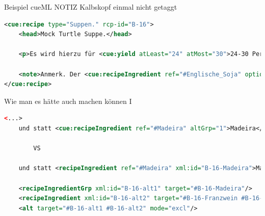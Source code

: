 \documentclass[12pt]{beamer}
\begin{document}
\begin{frame}[fragile]{Beispiel cueML}
NOTIZ Kalbskopf einmal nicht getaggt
	\begin{lstlisting}[language=XML]
<cue:recipe type="Suppen." rcp-id="B-16">
	<head>Mock Turtle Suppe.</head>
	
	<p>Es wird hierzu für <cue:yield atLeast="24" atMost="30">24-30 Personen</cue:yield> eine kräftige <ref target="#Bouillon">Bouillon</ref> von 8-10 Pfund <cue:recipeIngredient ref="#Rindkochfleisch" atLeast="8" atMost="10" unit="Pfund">Rindfleisch</cue:recipeIngredient> mit <cue:recipeIngredient ref="#Wurzelwerk">Wurzelwerk </cue:recipeIngredient> gekocht. [...]</p>
	
	<note>Anmerk. Der <cue:recipeIngredient ref="#Englische_Soja" optional="True">Soja</cue:recipeIngredient> macht die Suppe gewürzreicher, kann jedoch gut wegbleiben, und statt <cue:recipeIngredient ref="#Madeira" altGrp="1">Madeira</cue:recipeIngredient> kann man <cue:recipeIngredient ref="weißen_Franzwein" altGrp="2">weißen Franzwein</cue:recipeIngredient> und etwas <cue:recipeIngredient ref="#Rum" altGrp="2" quantity="etwas">Rum</cue:recipeIngredient> nehmen<cue:alt target="1 2"/>. Sowohl die Bouillon als Kalbskopf können schon am vorhergehenden Tage, ohne Nachtheil der Suppe, gekocht werden.</note>
</cue:recipe>
	\end{lstlisting}
\end{frame}

\begin{frame}[fragile]{Wie man es hätte auch machen können I}
	\begin{lstlisting}[language=XML]
	<...>
	und statt <cue:recipeIngredient ref="#Madeira" altGrp="1">Madeira</cue:recipeIngredient> kann man <cue:recipeIngredient ref="weißen_Franzwein" altGrp="2">weißen Franzwein</cue:recipeIngredient> und etwas <cue:recipeIngredient ref="#Rum" altGrp="2" quantity="etwas">Rum</cue:recipeIngredient> nehmen <cue:alt target="1 2"/>.
	
		VS
	
	und statt <recipeIngredient ref="#Madeira" xml:id="B-16-Madeira">Madeira</recipeIngredient> kann man <recipeIngredient ref="weißen_Franzwein" xml:id="B-16-Franzwein">weißen Franzwein</recipeIngredient> und etwas <recipeIngredient ref="#Rum" xml:id="B-16-Rum">Rum</recipeIngredient> nehmen. Sowohl die Bouillon als Kalbskopf können schon am vorhergehenden Tage, ohne Nachtheil der Suppe, gekocht werden.
	
	<recipeIngredientGrp xml:id="B-16-alt1" target="#B-16-Madeira"/>
	<recipeIngredient xml:id="B-16-alt2" target="#B-16-Franzwein #B-16-Rum"/>
	<alt target="#B-16-alt1 #B-16-alt2" mode="excl"/>
	\end{lstlisting}
\end{frame}
\end{document}
